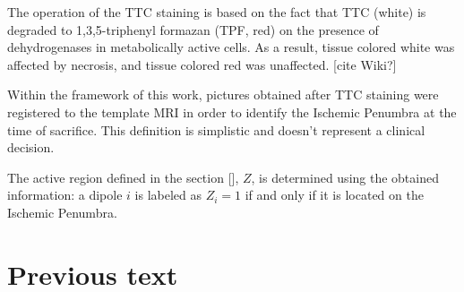 The operation of the TTC staining is based on the fact that TTC (white) 
is degraded to 1,3,5-triphenyl formazan (TPF, red)
on the presence of dehydrogenases in metabolically active cells.
%
As a result, tissue colored white was affected by necrosis, and tissue colored red was unaffected. 
[cite Wiki?]


Within the framework of this work, pictures obtained after TTC staining were registered to the template MRI in order to identify the Ischemic Penumbra at the time of sacrifice.
%
This definition is simplistic and doesn't represent a clinical decision.

The active region defined in the section [], $Z$, is determined using the obtained information: a dipole $i$ is labeled as $Z_i=1$ if and only if it is located on the Ischemic Penumbra.



\section{Previous text}





 



 




 



